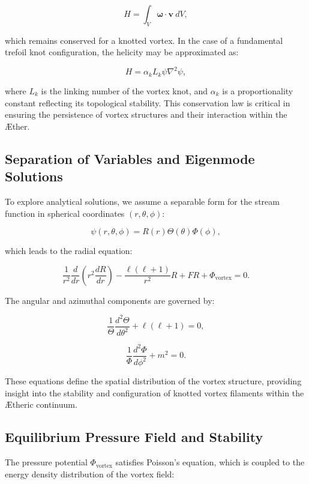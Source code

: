 \begin{equation*}
H = \int_V \boldsymbol{\omega} \cdot \mathbf{v} \ dV,
\end{equation*}

which remains conserved for a knotted vortex. In the case of a fundamental trefoil knot configuration, the helicity may be approximated as:

\begin{equation*}
H = \alpha_k L_k \psi \nabla^2 \psi,
\end{equation*}

where $L_k$ is the linking number of the vortex knot, and $\alpha_k$ is a proportionality constant reflecting its topological stability. This conservation law is critical in ensuring the persistence of vortex structures and their interaction within the \AE ther.

\subsection{Separation of Variables and Eigenmode Solutions}
To explore analytical solutions, we assume a separable form for the stream function in spherical coordinates $(r, \theta, \phi)$:

\begin{equation*}
\psi(r, \theta, \phi) = R(r) \Theta(\theta) \Phi(\phi),
\end{equation*}

which leads to the radial equation:

\begin{equation*}
\frac{1}{r^2} \frac{d}{dr} \left( r^2 \frac{dR}{dr} \right) - \frac{\ell (\ell+1)}{r^2} R + F R + \Phi_{\text{vortex}} = 0.
\end{equation*}

The angular and azimuthal components are governed by:

\begin{equation*}
\frac{1}{\Theta} \frac{d^2\Theta}{d\theta^2} + \ell(\ell+1) = 0,
\end{equation*}

\begin{equation*}
\frac{1}{\Phi} \frac{d^2\Phi}{d\phi^2} + m^2 = 0.
\end{equation*}

These equations define the spatial distribution of the vortex structure, providing insight into the stability and configuration of knotted vortex filaments within the \AE theric continuum.

\subsection{Equilibrium Pressure Field and Stability}
The pressure potential $\Phi_{\text{vortex}}$ satisfies Poisson's equation, which is coupled to the energy density distribution of the vortex field:


